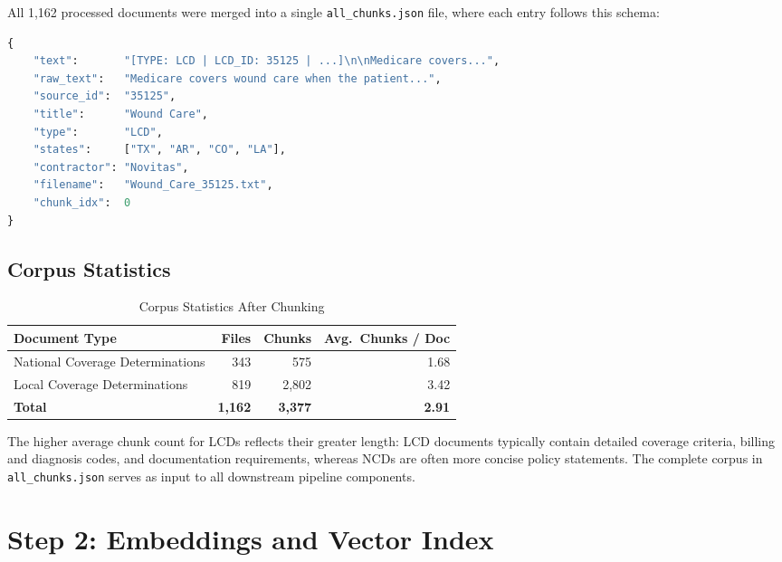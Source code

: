 \documentclass[12pt, letterpaper]{article}
\begin{document}
All 1,162 processed documents were merged into a single \texttt{all\_chunks.json} file,
where each entry follows this schema:

\begin{lstlisting}[language=Python, caption=JSON schema for each chunk in all\_chunks.json]
{
    "text":       "[TYPE: LCD | LCD_ID: 35125 | ...]\n\nMedicare covers...",
    "raw_text":   "Medicare covers wound care when the patient...",
    "source_id":  "35125",
    "title":      "Wound Care",
    "type":       "LCD",
    "states":     ["TX", "AR", "CO", "LA"],
    "contractor": "Novitas",
    "filename":   "Wound_Care_35125.txt",
    "chunk_idx":  0
}
\end{lstlisting}

\subsection{Corpus Statistics}

\begin{table}[h]
\centering
\caption{Corpus Statistics After Chunking}
\label{tab:corpus}
\begin{tabular}{@{}lrrr@{}}
\toprule
\textbf{Document Type} & \textbf{Files} & \textbf{Chunks} & \textbf{Avg.\ Chunks / Doc} \\
\midrule
National Coverage Determinations & 343  & 575   & 1.68 \\
Local Coverage Determinations    & 819  & 2,802 & 3.42 \\
\midrule
\textbf{Total}                   & \textbf{1,162} & \textbf{3,377} & \textbf{2.91} \\
\bottomrule
\end{tabular}
\end{table}

The higher average chunk count for LCDs reflects their greater length: LCD documents
typically contain detailed coverage criteria, billing and diagnosis codes, and
documentation requirements, whereas NCDs are often more concise policy statements.
The complete corpus in \texttt{all\_chunks.json} serves as input to all downstream
pipeline components.

\section{Step 2: Embeddings and Vector Index}
\end{document}
